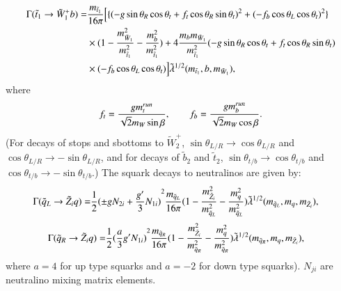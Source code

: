 \documentclass[final,3p,times,pdflatex]{elsarticle}
\begin{document}
\begin{equation}\label{t1bch1}
\begin{aligned}
\Gamma(\tilde{t}_{1} \rightarrow \tilde{W}_{1}^+ b ) = & {m_{\tilde{t}_1} \over 16\pi} \Big[\{ ({-g\sin\theta_R\cos\theta_t + f_t\cos\theta_R\sin\theta_t})^2 + ({-f_b\cos\theta_L\cos\theta_t})^2\} \\ & \times (1 - {m_{\tilde{W}_{1}}^2 \over m_{\tilde{t}_{1}}^2 } - {m_{b}^2 \over m_{\tilde{t}_{1}}^2 } ) + 4 {m_b m_{\tilde{W}_1} \over m_{\tilde{t}_1}^2 }({-g\sin\theta_R\cos\theta_t + f_t\cos\theta_R\sin\theta_t})\\ & \times (-f_{b}\cos\theta_L\cos\theta_t)\Big]  \tilde{\lambda}^{1/2}(m_{\tilde{t}_1},b,m_{\tilde{W}_1}) ,
\end{aligned}
\end{equation} 
where 
\begin{equation} \label{ftfb}
f_t = {g m_t^{run} \over \sqrt{2}m_W\sin\beta }, \quad \quad f_b = {g m_b^{run} \over \sqrt{2}m_W\cos\beta }.
\end{equation}
(For decays of stops and sbottoms to $\tilde{W}_{2}^+$, $\sin
\theta_{L/R}\rightarrow \cos \theta_{L/R}$ and $\cos \theta_{L/R}\rightarrow
-\sin \theta_{L/R}$, and for decays of $\tilde{b}_2$ 
and $\tilde{t}_2$, $\sin \theta_{t/b} \rightarrow
\cos \theta_{t/b}$ and $\cos \theta_{t/b}\rightarrow -\sin \theta_{t/b}$.)
The squark decays to neutralinos are given by:
\begin{equation} \label{qLqneut}
\begin{aligned}
\Gamma(\tilde{q}_L \rightarrow \tilde{Z}_i q ) = & {1 \over 2} {(\pm g N_{2i} + {g' \over 3} N_{1i})}^2 {m_{\tilde{q}_L}  \over 16\pi} (1 - {m_{\tilde{Z}_i}^2 \over m_{\tilde{q}_L}^2 } - {m_{q}^2 \over m_{\tilde{q}_L}^2 } ) \tilde{\lambda}^{1/2}(m_{\tilde{q}_L}, m_q, m_{\tilde{Z}_i}),
\end{aligned}
\end{equation} 
\begin{equation} \label{qRqneut}
\begin{aligned}
\Gamma(\tilde{q}_R \rightarrow \tilde{Z}_i q ) = & {1 \over 2} {( {a \over 3} g'  N_{1i})}^2 {m_{\tilde{q}_R}  \over 16\pi} (1 - {m_{\tilde{Z}_i}^2 \over m_{\tilde{q}_R}^2 } - {m_{q}^2 \over m_{\tilde{q}_R}^2 } ) \tilde{\lambda}^{1/2}(m_{\tilde{q}_R}, m_q, m_{\tilde{Z}_i}),
\end{aligned}
\end{equation}
where $a = 4$ for up type squarks and $a = -2$ for down type squarks). $N_{ji}$ are neutralino mixing matrix elements.
\end{document}
